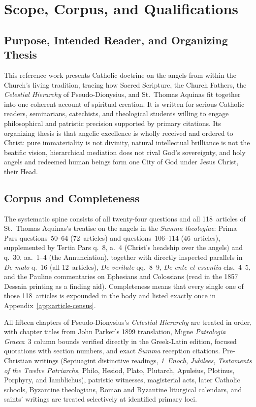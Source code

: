 \section{Scope, Corpus, and Qualifications}
\label{app:scope}

\subsection{Purpose, Intended Reader, and Organizing Thesis}

This reference work presents Catholic doctrine on the angels from within the Church's living tradition, tracing how Sacred Scripture, the Church Fathers, the \emph{Celestial Hierarchy} of Pseudo-Dionysius, and St.~Thomas Aquinas fit together into one coherent account of spiritual creation. It is written for serious Catholic readers, seminarians, catechists, and theological students willing to engage philosophical and patristic precision supported by primary citations. Its organizing thesis is that angelic excellence is wholly received and ordered to Christ: pure immateriality is not divinity, natural intellectual brilliance is not the beatific vision, hierarchical mediation does not rival God's sovereignty, and holy angels and redeemed human beings form one City of God under Jesus Christ, their Head.

\subsection{Corpus and Completeness}

The systematic spine consists of all twenty-four questions and all 118~articles of St.~Thomas Aquinas's treatise on the angels in the \emph{Summa theologiae}: Prima Pars questions~50--64 (72~articles) and questions~106--114 (46~articles), supplemented by Tertia Pars q.~8, a.~4 (Christ's headship over the angels) and q.~30, aa.~1--4 (the Annunciation), together with directly inspected parallels in \emph{De malo} q.~16 (all 12~articles), \emph{De veritate} qq.~8--9, \emph{De ente et essentia} chs.~4--5, and the Pauline commentaries on Ephesians and Colossians (read in the 1857 Dessain printing as a finding aid). Completeness means that every single one of those 118~articles is expounded in the body and listed exactly once in Appendix~\ref{app:article-census}.

All fifteen chapters of Pseudo-Dionysius's \emph{Celestial Hierarchy} are treated in order, with chapter titles from John Parker's 1899 translation, Migne \emph{Patrologia Graeca}~3 column bounds verified directly in the Greek-Latin edition, focused quotations with section numbers, and exact \emph{Summa} reception citations. Pre-Christian writings (Septuagint distinctive readings, \emph{1~Enoch}, \emph{Jubilees}, \emph{Testaments of the Twelve Patriarchs}, Philo, Hesiod, Plato, Plutarch, Apuleius, Plotinus, Porphyry, and Iamblichus), patristic witnesses, magisterial acts, later Catholic schools, Byzantine theologians, Roman and Byzantine liturgical calendars, and saints' writings are treated selectively at identified primary loci.

